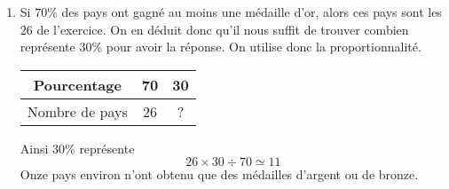 \documentclass[12pt, french]{article}
\begin{document}
\begin{enumerate}
	\item Si $70\%$	des pays ont gagné au moins une médaille d'or, alors ces pays sont les $26$ de l'exercice. On en déduit donc qu'il nous suffit de trouver combien représente $30\%$ pour avoir la réponse. On utilise donc la proportionnalité.
	\begin{center}
		\begin{tabular}{|c|c|c|}
		\hline
		Pourcentage & 70 & 30 \\
		\hline
		Nombre de pays & 26 & ? \\
		\hline
		\end{tabular}
	\end{center}
	Ainsi $30\%$ représente 
	\[26\times 30 \div 70 \simeq 11\]
	Onze pays environ n'ont obtenu que des médailles d'argent ou de bronze.
	\end{enumerate}

	
	
\end{document}

